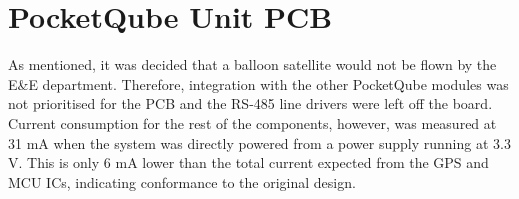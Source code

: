 \section{PocketQube Unit PCB}

As mentioned, it was decided that a balloon satellite would not be flown by the E\&E department. Therefore, integration with the other PocketQube modules was not prioritised for the PCB and the RS-485 line drivers were left off the board. Current consumption for the rest of the components, however, was measured at 31 mA when the system was directly powered from a power supply running at 3.3 V. This is only 6 mA lower than the total current expected from the GPS and MCU ICs, indicating conformance to the original design.